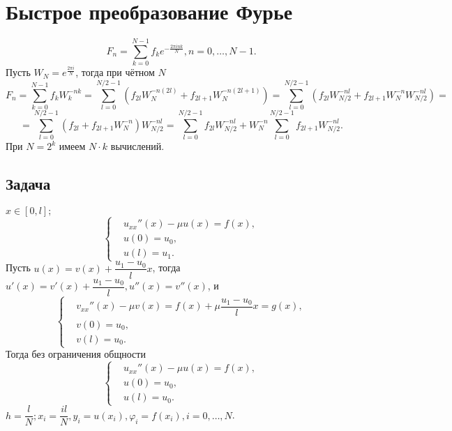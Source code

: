 \section{Быстрое преобразование Фурье}

\[ F_n = \sum \limits_{k = 0}^{N - 1} f_k e^{-\frac{2 \pi i n k}{N}}, n = 0, \ldots, N - 1. \]
Пусть \( W_N = e^{\frac{2 \pi i}{N}} \), тогда при чётном $N$
\[ F_n = \sum \limits_{k = 0}^{N - 1} f_k W_k^{-n k} = \sum \limits_{l = 0}^{N / 2 - 1} (f_{2 l} W_N^{-n (2 l)} + f_{2 l + 1} W_N^{-n (2 l + 1)}) = \sum \limits_{l = 0}^{N / 2 - 1} (f_{2 l} W_{N / 2}^{-n l} + f_{2 l + 1} W_N^{-n} W_{N / 2}^{-n l}) = \]
\[ = \sum \limits_{l = 0}^{N / 2 - 1} (f_{2 l} + f_{2 l + 1} W_N^{-n}) W_{N / 2}^{-n l} = \sum \limits_{l = 0}^{N / 2 - 1} f_{2 l} W_{N / 2}^{-n l} + W_N^{-n} \sum \limits_{l = 0}^{N / 2 - 1} f_{2 l + 1} W_{N / 2}^{-n l}. \]
При \( N = 2^k \) имеем \( N \cdot k \) вычислений.

\subsection*{Задача}

\( x \in [0, l]; \)  
\[ \left\lbrace \begin{aligned}
    & u_{xx}''(x) - \mu u(x) = f(x), \\
    & u(0) = u_0, \\
    & u(l) = u_1.
\end{aligned} \right. \]
Пусть \( u(x) = v(x) + \dfrac{u_1 - u_0}{l} x \), тогда \( u'(x) = v'(x) + \dfrac{u_1 - u_0}{l}, u''(x) = v''(x) \), и
\[ \left\lbrace \begin{aligned}
    & v_{xx}''(x) - \mu v(x) = f(x) + \mu \dfrac{u_1 - u_0}{l} x = g(x), \\
    & v(0) = u_0, \\
    & v(l) = u_0.
\end{aligned} \right. \]
Тогда без ограничения общности
\[ \left\lbrace \begin{aligned}
    & u_{xx}''(x) - \mu u(x) = f(x), \\
    & u(0) = u_0, \\
    & u(l) = u_0.
\end{aligned} \right. \]
\( h = \dfrac{l}{N}; x_i = \dfrac{i l}{N}, y_i = u(x_i), \varphi_i = f(x_i), i = 0, \ldots, N \).

